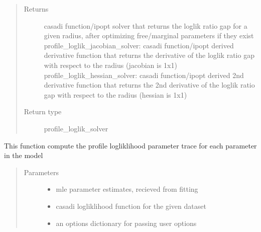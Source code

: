\documentclass[letterpaper,10pt,english]{sphinxmanual}
\begin{document}
\begin{fulllineitems}
\begin{fulllineitems}
\begin{quote}
\begin{description}
\begin{itemize}
\end{itemize}

\item[{Returns}] \leavevmode
casadi function/ipopt solver that returns the loglik ratio gap for a given radius,  after optimizing free/marginal parameters if they exist
profile\_loglik\_jacobian\_solver: casadi function/ipopt derived derivative function that returns the derivative of the loglik ratio gap with respect to the radius (jacobian is 1x1)
profile\_loglik\_hessian\_solver: casadi function/ipopt derived 2nd derivative function that returns the 2nd derivative of the loglik ratio gap with respect to the radius (hessian is 1x1)

\item[{Return type}] \leavevmode
profile\_loglik\_solver

\end{description}\end{quote}

\end{fulllineitems}


\begin{fulllineitems}
\label{\detokenize{nloed:nloed.model.Model.__profiletrace}}
This function compute the profile logliklihood parameter trace for each parameter in the model
\begin{quote}\begin{description}
\item[{Parameters}] \leavevmode\begin{itemize}
\item {} 
 \textendash{} mle parameter estimates,  recieved from fitting

\item {} 
 \textendash{} casadi logliklihood function for the given dataset

\item {} 
 \textendash{} an options dictionary for passing user options

\end{itemize}


\end{description}
\end{quote}
\end{fulllineitems}
\end{fulllineitems}
\end{document}
